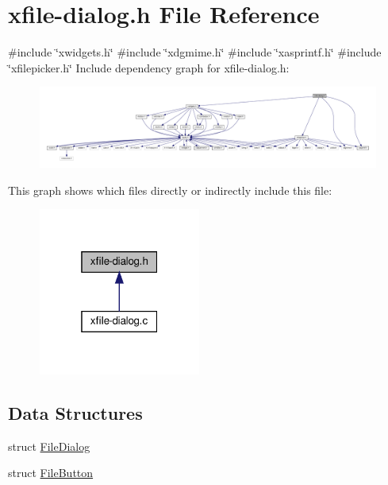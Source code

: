 \hypertarget{xfile-dialog_8h}{}\section{xfile-\/dialog.h File Reference}
\label{xfile-dialog_8h}
{\ttfamily \#include \char`\"{}xwidgets.\+h\char`\"{}}\newline
{\ttfamily \#include \char`\"{}xdgmime.\+h\char`\"{}}\newline
{\ttfamily \#include \char`\"{}xasprintf.\+h\char`\"{}}\newline
{\ttfamily \#include \char`\"{}xfilepicker.\+h\char`\"{}}\newline
Include dependency graph for xfile-\/dialog.h\+:
\nopagebreak
\begin{figure}[H]
\begin{center}
\leavevmode
\includegraphics[width=350pt]{xfile-dialog_8h__incl}
\end{center}
\end{figure}
This graph shows which files directly or indirectly include this file\+:
\nopagebreak
\begin{figure}[H]
\begin{center}
\leavevmode
\includegraphics[width=151pt]{xfile-dialog_8h__dep__incl}
\end{center}
\end{figure}
\subsection*{Data Structures}
\begin{DoxyCompactItemize}
\item 
struct \hyperlink{structFileDialog}{File\+Dialog}
\item 
struct \hyperlink{structFileButton}{File\+Button}
\end{DoxyCompactItemize}
